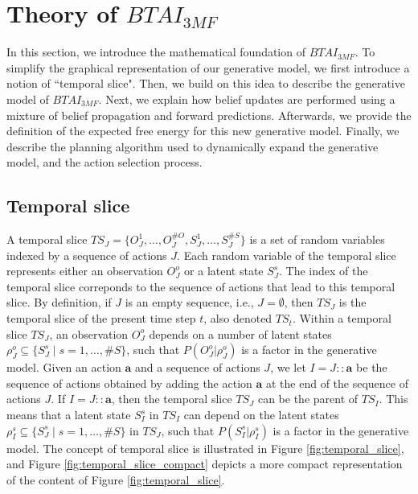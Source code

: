 \documentclass[twoside,11pt]{article}
\newcommand{\nb}[1]{\# #1}
\begin{document}
\section{Theory of $BTAI_{3MF}$} \label{sec:btai_3mf}

In this section, we introduce the mathematical foundation of $BTAI_{3MF}$. To simplify the graphical representation of our generative model, we first introduce a notion of ``temporal slice". Then, we build on this idea to describe the generative model of $BTAI_{3MF}$. Next, we explain how belief updates are performed using a mixture of belief propagation and forward predictions. Afterwards, we provide the definition of the expected free energy for this new generative model. Finally, we describe the planning algorithm used to dynamically expand the generative model, and the action selection process.

\subsection{Temporal slice} \label{ssec:temporal_slice}

A temporal slice $TS_J = \{O_J^1, \hdots, O_J^{\nb{O}}, S_J^1, \hdots, S_J^{\nb{S}}\}$ is a set of random variables indexed by a sequence of actions $J$. Each random variable of the temporal slice represents either an observation $O_J^o$ or a latent state $S_J^s$. The index of the temporal slice correponds to the sequence of actions that lead to this temporal slice. By definition, if $J$ is an empty sequence, i.e., $J = \emptyset$, then $TS_J$ is the temporal slice of the present time step $t$, also denoted $TS_t$. Within a temporal slice $TS_J$, an observation $O_J^o$ depends on a number of latent states $\rho_J^o \subseteq \{S_J^s \mid s = 1, \hdots, \nb{S}\}$, such that $P(O_J^o|\rho_J^o)$ is a factor in the generative model. Given an action $\bm{a}$ and a sequence of actions $J$, we let $I = J::\bm{a}$ be the sequence of actions obtained by adding the action $\bm{a}$ at the end of the sequence of actions $J$. If $I = J::\bm{a}$, then the temporal slice $TS_J$ can be the parent of $TS_I$. This means that a latent state $S^s_I$ in $TS_I$ can depend on the latent states $\rho_I^s \subseteq \{S_J^s \mid s = 1, \hdots, \nb{S}\}$ in $TS_J$, such that $P(S_I^s|\rho_I^s)$ is a factor in the generative model. The concept of temporal slice is illustrated in Figure \ref{fig:temporal_slice}, and Figure \ref{fig:temporal_slice_compact} depicts a more compact representation of the content of Figure \ref{fig:temporal_slice}.
\end{document}
